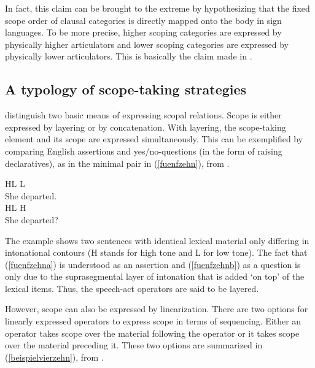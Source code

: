 In fact, this claim can be brought to the extreme by hypothesizing that the fixed scope order of clausal categories is directly mapped onto the body in sign languages. To be more precise, higher scoping categories are expressed by physically higher articulators and lower scoping categories are expressed by physically lower articulators. This is basically the claim made in \citet{bross2017scope}.

\subsection{A typology of scope-taking strategies}
\citet{bross2017scope} distinguish two basic means of expressing scopal relations. Scope is either expressed by layering or by concatenation. With layering, the scope-taking element and its scope are expressed simultaneously. This can be exemplified by comparing English assertions and yes/no-questions (in the form of raising declaratives), as in the minimal pair in (\ref{fuenfzehn}), from \citet{bross2017scope}.

\begin{exe} 
\ex \label{fuenfzehn}
\begin{xlist} 
\ex 
\gll {} {\hspace{12pt} HL L} \\
She departed. \\ \label{fuenfzehna}
\ex 
\gll {} {\hspace{12pt} HL H} \\
She departed? \\ \label{fuenfzehnb} 
\end{xlist} 
\end{exe}

\noindent The example shows two sentences with identical lexical material only differing in intonational contours (H stands for high tone and L for low tone). The fact that (\ref{fuenfzehna}) is understood as an assertion and (\ref{fuenfzehnb}) as a question is only due to the suprasegmental layer of intonation that is added `on top' of the lexical items. Thus, the speech-act operators are said to be layered. 

However, scope can also be expressed by linearization. There are two options for linearly expressed operators to express scope in terms of sequencing. Either an operator takes scope over the material following the operator or it takes scope over the material preceding it. These two options are summarized in (\ref{beispielvierzehn}), from \citet{bross2017scope}.

